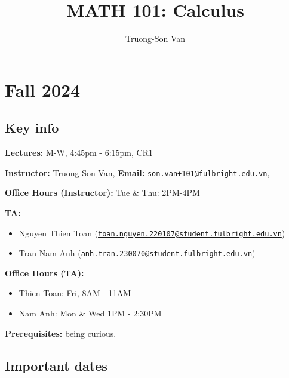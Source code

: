 \documentclass[
]{article}
\title{MATH 101: Calculus}
\author{Truong-Son Van}
\date{}
\begin{document}
\maketitle

{
\setcounter{tocdepth}{2}
\tableofcontents
}
\section*{Fall 2024}\label{fall-2024}

\subsection*{Key info}\label{key-info}

\textbf{Lectures:} M-W, 4:45pm - 6:15pm, CR1

\textbf{Instructor:} Truong-Son Van, \textbf{Email:} \href{mailto:son.van+101@fulbright.edu.vn}{\nolinkurl{son.van+101@fulbright.edu.vn}},

\textbf{Office Hours (Instructor):} Tue \& Thu: 2PM-4PM

\textbf{TA:}

\begin{itemize}
\item
  Nguyen Thien Toan (\href{mailto:toan.nguyen.220107@student.fulbright.edu.vn}{\nolinkurl{toan.nguyen.220107@student.fulbright.edu.vn}})
\item
  Tran Nam Anh (\href{mailto:anh.tran.230070@student.fulbright.edu.vn}{\nolinkurl{anh.tran.230070@student.fulbright.edu.vn}})
\end{itemize}

\textbf{Office Hours (TA):}

\begin{itemize}
\item
  Thien Toan: Fri, 8AM - 11AM
\item
  Nam Anh: Mon \& Wed 1PM - 2:30PM
\end{itemize}

\textbf{Prerequisites:} being curious.

\subsection*{Important dates}\label{important-dates}
\end{document}
